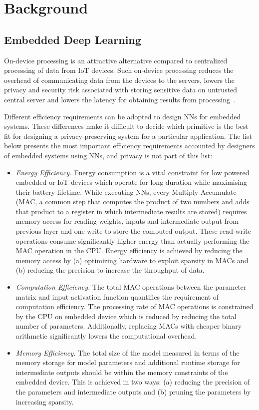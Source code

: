 \section{Background}
\label{background}

\subsection{Embedded Deep Learning}

On-device processing is an attractive alternative compared to centralized processing of data from IoT devices.
Such on-device processing reduces the overhead of communicating data from the devices to the servers, lowers the privacy and security risk associated with storing sensitive data on untrusted central server and lowers the latency for obtaining results from processing~\cite{8110880}.

Different efficiency requirements can be adopted to design NNs for embedded systems.
These differences make it difficult to decide which primitive is the best fit for designing a privacy-preserving system for a particular application.
The list below presents the most important efficiency requirements accounted by designers of embedded systems using NNs, and privacy is not part of this list:

\begin{itemize}[leftmargin=*]
\item {\em Energy Efficiency.} Energy consumption is a vital constraint for low powered embedded or IoT devices which operate for long duration while maximising their battery lifetime.
While executing NNs, every Multiply Accumulate (MAC, a common step that computes the product of two numbers and adds that product to a register in which intermediate results are stored) requires memory access for reading weights, inputs and intermediate output from previous layer and one write to store the computed output. These read-write operations consume significantly higher energy than actually performing the MAC operation in the CPU.
Energy efficiency is achieved by reducing the memory access by (a) optimizing hardware to exploit sparsity in MACs and (b) reducing the precision to increase the throughput of data.

\item {\em Computation Efficiency.} The total MAC operations between the parameter matrix and input activation function quantifies the requirement of computation efficiency.
The processing rate of MAC operations is constrained by the CPU on embedded device which is reduced by reducing the total number of parameters.
Additionally, replacing MACs with cheaper binary arithmetic significantly lowers the computational overhead.

\item {\em Memory Efficiency.} The total size of the model measured in terms of the memory storage for model parameters and additional runtime storage for intermediate outputs should be within the memory constraints of the embedded device.
This is achieved in two ways: (a) reducing the precision of the parameters and intermediate outputs and (b) pruning the parameters by increasing sparsity.
\end{itemize}


